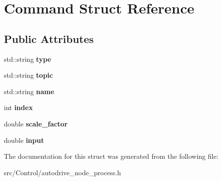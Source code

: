 \hypertarget{structCommand}{}\section{Command Struct Reference}
\label{structCommand}
\subsection*{Public Attributes}
\begin{DoxyCompactItemize}
\item 
\mbox{\label{structCommand_aa06a51848622ae70262ac35449b11f67}} 
std\+::string {\bfseries type}
\item 
\mbox{\label{structCommand_a58a73cd17ee16f7b9c349e5c71cafd2e}} 
std\+::string {\bfseries topic}
\item 
\mbox{\label{structCommand_a8d66550a9895cbd96373a9a221fa2b25}} 
std\+::string {\bfseries name}
\item 
\mbox{\label{structCommand_a261bd389487d2fafb889a3c316388401}} 
int {\bfseries index}
\item 
\mbox{\label{structCommand_af6675d2fdd4e15a0e12e2d96f9ce540d}} 
double {\bfseries scale\+\_\+factor}
\item 
\mbox{\label{structCommand_ad0cf300df1748b49b26a296e0859aae3}} 
double {\bfseries input}
\end{DoxyCompactItemize}


The documentation for this struct was generated from the following file\+:\begin{DoxyCompactItemize}
\item 
src/\+Control/autodrive\+\_\+node\+\_\+process.\+h\end{DoxyCompactItemize}
